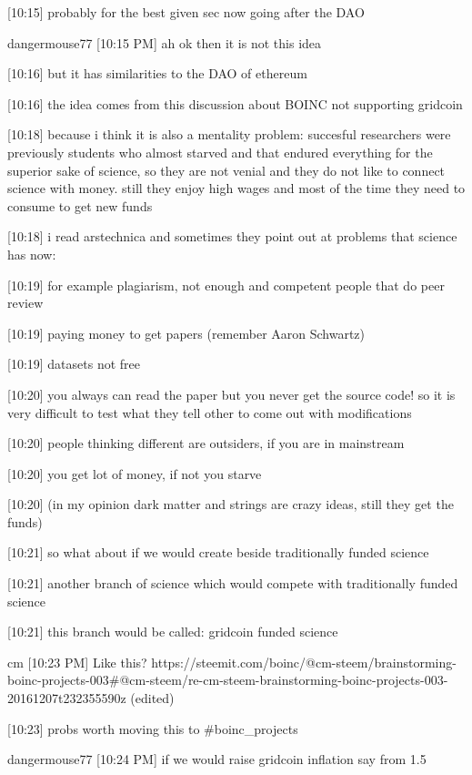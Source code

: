 {[10:15] 
probably for the best given sec now going after the DAO


dangermouse77 [10:15 PM] 
ah ok then it is not this idea


[10:16] 
but it has similarities to the DAO of ethereum


[10:16] 
the idea comes from this discussion about BOINC not supporting gridcoin


[10:18] 
because i think it is also a mentality problem: succesful researchers were previously students who almost starved and that endured everything for the superior sake of science, so they are not venial and they do not like to connect science with money. still they enjoy high wages and most of the time they need to consume to get new funds


[10:18] 
i read arstechnica and sometimes they point out at problems that science has now:


[10:19] 
for example plagiarism, not enough and competent people that do peer review


[10:19] 
paying money to get papers (remember Aaron Schwartz)


[10:19] 
datasets not free


[10:20] 
you always can read the paper but you never get the source code! so it is very difficult to test what they tell other to come out with modifications


[10:20] 
people thinking different are outsiders, if you are in mainstream


[10:20] 
you get lot of money, if not you starve


[10:20] 
(in my opinion dark matter and strings are crazy ideas, still they get the funds)


[10:21] 
so what about if we would create beside traditionally funded science


[10:21] 
another branch of science which would compete with traditionally funded science


[10:21] 
this branch would be called: gridcoin funded science


cm 
[10:23 PM] 
Like this? https://steemit.com/boinc/@cm-steem/brainstorming-boinc-projects-003#@cm-steem/re-cm-steem-brainstorming-boinc-projects-003-20161207t232355590z (edited)


[10:23] 
probs worth moving this to #boinc_projects


dangermouse77 [10:24 PM] 
if we would raise gridcoin inflation say from 1.5%


}

